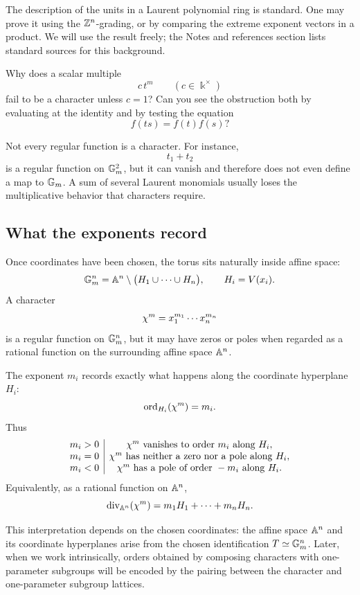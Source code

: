 \begin{observation}
The description of the units in a Laurent polynomial ring is standard.
One may prove it using the \(\mathbb{Z}^n\)-grading, or by comparing the
extreme exponent vectors in a product. We will use the result freely;
the Notes and references section lists standard sources for this
background.
\end{observation}

\begin{pauseandthink}
Why does a scalar multiple
\[
c\,t^m
\qquad(c\in\Bbbk^\times)
\]
fail to be a character unless \(c=1\)? Can you see the obstruction
both by evaluating at the identity and by testing the equation
\[
f(ts)=f(t)f(s)?
\]
\end{pauseandthink}

Not every regular function is a character. For instance,
\[
t_1+t_2
\]
is a regular function on \(\mathbb{G}_{m}^2\), but it can vanish and therefore
does not even define a map to \(\mathbb{G}_{m}\). A sum of several Laurent
monomials usually loses the multiplicative behavior that characters
require.

\subsection{What the exponents record}

Once coordinates have been chosen, the torus sits naturally inside
affine space:
\[
\mathbb{G}_{m}^n
=
\mathbb{A}^n\setminus\bigl(H_1\cup\cdots\cup H_n\bigr),
\qquad
H_i=V(x_i).
\]
A character
\[
\chi^{m}
=
x_1^{m_1}\cdots x_n^{m_n}
\]
is a regular function on \(\mathbb{G}_{m}^n\), but it may have zeros or poles
when regarded as a rational function on the surrounding affine space
\(\mathbb{A}^n\).

The exponent \(m_i\) records exactly what happens along the coordinate
hyperplane \(H_i\):
\[
\operatorname{ord}_{H_i}(\chi^{m})=m_i.
\]
Thus
\[
\begin{array}{c|c}
m_i>0
&
\chi^{m}\text{ vanishes to order }m_i\text{ along }H_i,
\\
m_i=0
&
\chi^{m}\text{ has neither a zero nor a pole along }H_i,
\\
m_i<0
&
\chi^{m}\text{ has a pole of order }-m_i\text{ along }H_i.
\end{array}
\]
Equivalently, as a rational function on \(\mathbb{A}^n\),
\[
\operatorname{div}_{\mathbb{A}^n}(\chi^{m})
=
m_1H_1+\cdots+m_nH_n.
\]

This interpretation depends on the chosen coordinates: the affine
space \(\mathbb{A}^n\) and its coordinate hyperplanes arise from the chosen
identification \(T\simeq\mathbb{G}_{m}^n\). Later, when we work intrinsically,
orders obtained by composing characters with one-parameter subgroups
will be encoded by the pairing between the character and
one-parameter subgroup lattices.

